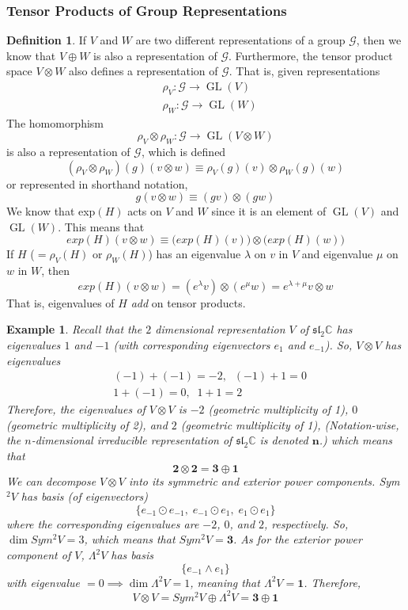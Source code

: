 \documentclass{article}
\DeclareMathOperator{\GL}{GL}
\newtheorem{example}{Example}[section]
\theoremstyle{remark}
\theoremstyle{definition}
\newtheorem{definition}{Definition}[section]
\begin{document}
\subsubsection{Tensor Products of Group Representations}

\begin{definition}
If $V$ and $W$ are two different representations of a group $\mathcal{G}$, then we know that $V \oplus W$ is also a representation of $\mathcal{G}$. Furthermore, the tensor product space $V \otimes W$ also defines a representation of $\mathcal{G}$. That is, given representations
\begin{align*}
    & \rho_V: \mathcal{G} \longrightarrow \GL(V) \\
    & \rho_W: \mathcal{G} \longrightarrow \GL(W)
\end{align*}
The homomorphism 
\[\rho_V \otimes \rho_W: \mathcal{G} \longrightarrow \GL(V \otimes W)\]
is also a representation of $\mathcal{G}$, which is defined
\[(\rho_V \otimes \rho_W)(g) (v \otimes w) \equiv \rho_V (g) (v) \otimes \rho_W (g) (w)\]
or represented in shorthand notation, 
\[g(v \otimes w) \equiv (g v) \otimes (g w)\]
We know that exp$(H)$ acts on $V$ and $W$ since it is an element of $\GL(V)$ and $\GL(W)$. This means that
\[exp(H)(v \otimes w) \equiv \big( exp(H)(v)\big) \otimes \big( exp(H)(w)\big)\]
If $H$ ($= \rho_V (H)$ or $\rho_W(H)$) has an eigenvalue $\lambda$ on $v$ in $V$ and eigenvalue $\mu$ on $w$ in $W$, then 
\[exp(H) (v \otimes w) = (e^\lambda v) \otimes (e^\mu w) = e^{\lambda + \mu} v \otimes w\]
That is, eigenvalues of $H$ \textit{add} on tensor products. 
\end{definition}

\begin{example}
Recall that the $2$ dimensional representation $V$ of $\mathfrak{sl}_2 \mathbb{C}$ has eigenvalues $1$ and $-1$ (with corresponding eigenvectors $e_1$ and $e_{-1}$). So, $V \otimes V$ has eigenvalues 
\begin{align*}
    & (-1) + (-1) = -2, \;\; (-1) + 1 = 0 \\
    & 1 + (-1) = 0, \;\; 1 + 1 = 2
\end{align*}
Therefore, the eigenvalues of $V \otimes V$ is $-2$ (geometric multiplicity of 1), $0$ (geometric multiplicity of 2), and $2$ (geometric multiplicity of 1), (Notation-wise, the $n$-dimensional irreducible representation of $\mathfrak{sl}_2 \mathbb{C}$ is denoted $\mathbf{n}$.) which means that
\[\mathbf{2} \otimes \mathbf{2} = \mathbf{3} \oplus \mathbf{1}\]
We can decompose $V \otimes V$ into its symmetric and exterior power components. Sym$^2 V$ has basis (of eigenvectors)
\[\{e_{-1} \odot e_{-1}, \; e_{-1} \odot e_1, \; e_1 \odot e_1\}\]
where the corresponding eigenvalues are $-2$, $0$, and $2$, respectively. So, $\dim{Sym^2 V} = 3$, which means that $Sym^2 V = \mathbf{3}$. As for the exterior power component of $V$, $\Lambda^2 V$ has basis 
\[\{e_{-1} \wedge e_1\}\]
with eigenvalue $= 0 \implies \dim{\Lambda^2 V} = 1$, meaning that $\Lambda^2 V = \mathbf{1}$. Therefore, 
\[V \otimes V = Sym^2 V \oplus \Lambda^2 V = \mathbf{3} \oplus \mathbf{1}\]
\end{example}
\end{document}
